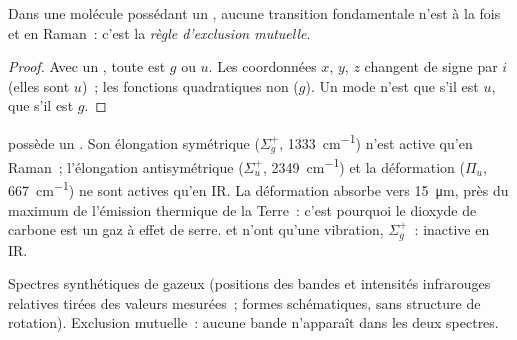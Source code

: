 \begin{proposition}\label{prop:b3:group-theory-applied:mutual-exclusion}
Dans une molécule possédant un , aucune transition
fondamentale n'est à la fois  et en Raman~: c'est la
\emph{règle d'exclusion mutuelle}.
\end{proposition}

\begin{proof}
Avec un , toute  est $g$ ou
$u$. Les coordonnées $x$, $y$, $z$ changent de signe par $i$ (elles sont
$u$)~; les fonctions quadratiques non ($g$). Un mode n'est 
que s'il est $u$,  que s'il est
$g$.
\end{proof}

\begin{example}\label{ex:b3:group-theory-applied:co2}
 possède un . Son élongation symétrique
($\Sigma_g^+$,
\qty{1333}{cm^{-1}}) n'est active qu'en Raman~; l'élongation
antisymétrique ($\Sigma_u^+$,
\qty{2349}{cm^{-1}}) et la déformation ($\Pi_u$, \qty{667}{cm^{-1}}) ne
sont actives qu'en IR.
La déformation absorbe vers \qty{15}{\micro m}, près du maximum de
l'émission thermique de la Terre~: c'est pourquoi le dioxyde de carbone
est un gaz à effet de serre.  et
 n'ont qu'une vibration, $\Sigma_g^+$~: inactive en IR.
\end{example}

\begin{omfigure}

{\small Spectres synthétiques de  gazeux (positions des bandes et
intensités infrarouges relatives tirées des valeurs mesurées~; formes
schématiques, sans structure de rotation). Exclusion mutuelle~: aucune
bande n'apparaît dans les deux spectres.}
\end{omfigure}

